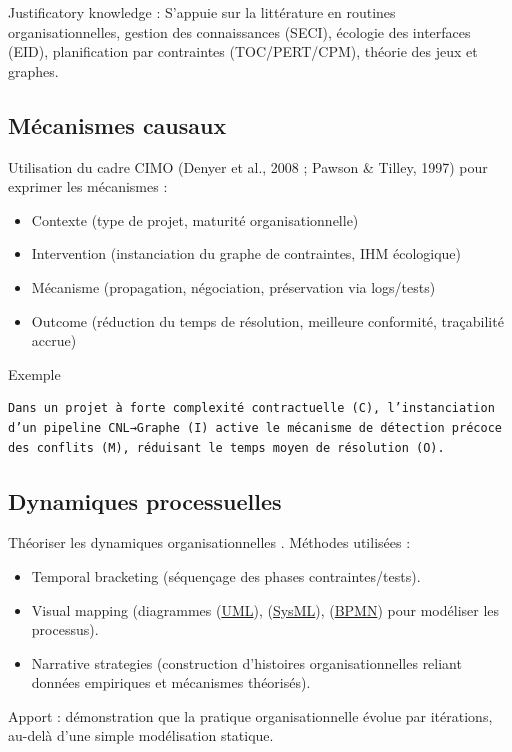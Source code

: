 \documentclass[a4paper,12pt]{article}
\begin{document}
Justificatory knowledge : S’appuie sur la littérature en routines organisationnelles, gestion des connaissances (SECI), écologie des interfaces (EID), planification par contraintes (TOC/PERT/CPM), théorie des jeux et graphes.
\subsection{Mécanismes causaux}
\label{sec:org117d37a}
Utilisation du cadre CIMO (Denyer et al., 2008 ; Pawson \& Tilley, 1997) pour exprimer les mécanismes :
\begin{itemize}
\item Contexte (type de projet, maturité organisationnelle)
\item Intervention (instanciation du graphe de contraintes, IHM écologique)
\item Mécanisme (propagation, négociation, préservation via logs/tests)
\item Outcome (réduction du temps de résolution, meilleure conformité, traçabilité accrue)
\end{itemize}

Exemple
\begin{verbatim}
Dans un projet à forte complexité contractuelle (C), l’instanciation d’un pipeline CNL→Graphe (I) active le mécanisme de détection précoce des conflits (M), réduisant le temps moyen de résolution (O).
\end{verbatim}
\subsection{Dynamiques processuelles}
\label{sec:orgd8311ec}
Théoriser les dynamiques organisationnelles \autocite[(1999)]{Langley}.
Méthodes utilisées :
\begin{itemize}
\item Temporal bracketing (séquençage des phases contraintes/tests).
\item Visual mapping (diagrammes  (\protect\hyperlink{gls-2}{\label{gls-2-use-1}UML}),  (\protect\hyperlink{gls-3}{\label{gls-3-use-1}SysML}),  (\protect\hyperlink{gls-4}{\label{gls-4-use-1}BPMN}) pour modéliser les processus).
\item Narrative strategies (construction d’histoires organisationnelles reliant données empiriques et mécanismes théorisés).
\end{itemize}

Apport : démonstration que la pratique organisationnelle évolue par itérations, au-delà d’une simple modélisation statique.
\end{document}
